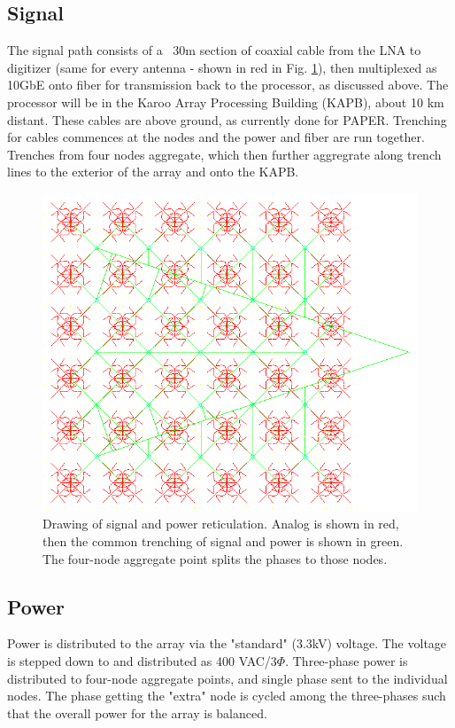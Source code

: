 \documentclass[11pt]{article}
\begin{document}
\subsection{Signal}
The signal path consists of a ~30m section of coaxial cable from the LNA to digitizer (same for every antenna - shown in red in Fig. \ref{fig:heraconfig576ret}), then multiplexed as 10GbE onto fiber for transmission back to the processor, as discussed above.  The processor will be in the Karoo Array Processing Building (KAPB), about 10 km distant. These cables are above ground, as currently done for PAPER.  Trenching for cables commences at the nodes and the power and fiber are run together.  Trenches from four nodes aggregate, which then further aggregrate along trench lines to the exterior of the array and onto the KAPB.

\begin{figure}[H]
\centering
\includegraphics[width=14cm]{plots/heraconfig576ret.png}
\caption{Drawing of signal and power reticulation.  Analog is shown in red, then the common trenching of signal and power is shown in green.  The four-node aggregate point splits the phases to those nodes.}
\label{fig:heraconfig576ret}
\end{figure}

\subsection{Power}
Power is distributed to the array via the "standard" (3.3kV) voltage.   The voltage is stepped down to and distributed as 400 VAC/3$\Phi$.  Three-phase power is distributed to four-node aggregate points, and single phase sent to the individual nodes.  The phase getting the "extra" node is cycled among the three-phases such that the overall power for the array is balanced.
\end{document}
